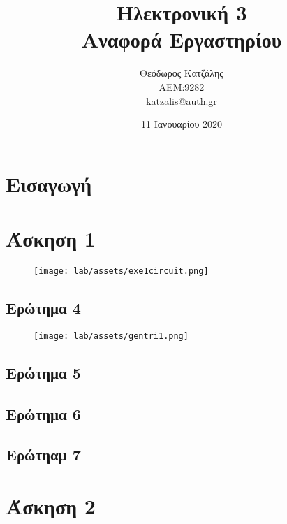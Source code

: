\documentclass[12pt, a4paper]{article}
\title{\textbf{Ηλεκτρονική 3} \\ \textbf{Αναφορά Εργαστηρίου}}
\author{Θεόδωρος Κατζάλης \\ ΑΕΜ:9282 \\ katzalis@auth.gr}
\date{11 Ιανουαρίου 2020}
\begin{document}
\maketitle
\sloppy
\tableofcontents
\pagebreak

\section{Εισαγωγή}

\section{Άσκηση 1}

\begin{figure}[h!]
	\centering
	\texttt{[image: lab/assets/exe1circuit.png]}
\end{figure}


\subsection{Ερώτημα 4}

\begin{figure}[h!]
	\centering
	\texttt{[image: lab/assets/gentri1.png]}
\end{figure}

\subsection{Ερώτημα 5}

\subsection{Ερώτημα 6}

\subsection{Ερώτηαμ 7}


\section{Άσκηση 2}
\end{document}
